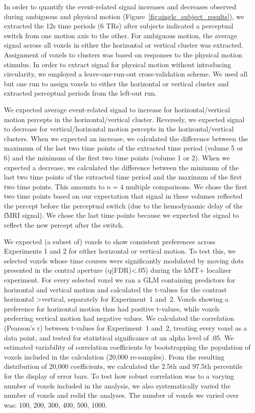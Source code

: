 In order to quantify the event-related signal increases and decreases observed during ambiguous and physical motion (Figure~\ref{fig:single_subject_results}), we extracted the 12s time periods (6 TRs) after subjects indicated a perceptual switch from one motion axis to the other. For ambiguous motion, the average signal across all voxels in either the horizontal or vertical cluster was extracted. Assignment of voxels to clusters was based on responses to the physical motion stimulus. In order to extract signal for physical motion without introducing circularity, we employed a leave-one-run-out cross-validation scheme. We used all but one run to assign voxels to either the horizontal or vertical cluster and extracted perceptual periods from the left-out run.

We expected average event-related signal to increase for horizontal/vertical motion percepts in the horizontal/vertical cluster. Reversely, we expected signal to decrease for vertical/horizontal motion percepts in the horizontal/vertical clusters. When we expected an increase, we calculated the difference between the maximum of the last two time points of the extracted time period (volume 5 or 6) and the minimum of the first two time points (volume 1 or 2). When we expected a decrease, we calculated the difference between the minimum of the last two time points of the extracted time period and the maximum of the first two time points. This amounts to $n=4$ multiple comparisons. We chose the first two time points based on our expectation that signal in these volumes reflected the percept before the perceptual switch (due to the hemodynamic delay of the fMRI signal). We chose the last time points because we expected the signal to reflect the new percept after the switch.

We expected (a subset of) voxels to show consistent preferences across Experiments 1 and 2 for either horizontal or vertical motion. To test this, we selected voxels whose time courses were significantly modulated by moving dots presented in the central aperture (q(FDR)\textless.05) during the hMT+ localizer experiment. For every selected voxel we ran a GLM containing predictors for horizontal and vertical motion and calculated the t-values for the contrast horizontal \textgreater vertical, separately for Experiment~1 and~2. Voxels showing a preference for horizontal motion thus had positive t-values, while voxels preferring vertical motion had negative values. We calculated the correlation (Pearson's r) between t-values for Experiment~1 and~2, treating every voxel as a data point, and tested for statistical significance at an alpha level of .05. We estimated variability of correlation coefficients by bootstrapping the population of voxels included in the calculation (20,000 re-samples). From the resulting distribution of 20,000 coefficients, we calculated the 2.5th and 97.5th percentile for the display of error bars. To test how robust correlation was to a varying number of voxels included in the analysis, we also systematically varied the number of voxels and redid the analyses. The number of voxels we varied over was: 100, 200, 300, 400, 500, 1000.

